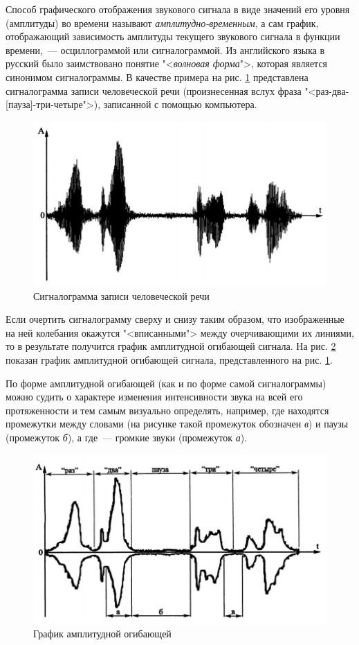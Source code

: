 \documentclass[oneside, final, 14pt]{extreport}
\begin{document}
Способ графического отображения звукового сигнала в виде значений его уровня (амплитуды) во времени называют {\itshape амплитудно-временным}, а сам график, отображающий зависимость амплитуды текущего звукового сигнала в функции времени,~--- осциллограммой или сигналограммой. Из английского языка в русский было заимствовано понятие "<{\itshape волновая форма}">, которая является синонимом сигналограммы. В качестве примера на рис. \ref{pic-waveform-01} представлена сигналограмма записи человеческой речи (произнесенная вслух фраза "<раз-два-[пауза]-три-четыре">), записанной с помощью компьютера.

\begin{figure}[h]
\centering
\includegraphics{pic-waveform-01}
\caption{Сигналограмма записи человеческой речи}
\label{pic-waveform-01}
\end{figure}

Если очертить сигналограмму сверху и снизу таким образом, что изображенные на ней колебания окажутся "<вписанными"> между очерчивающими их линиями, то в результате получится график амплитудной огибающей сигнала. На рис. \ref{pic-waveform-02} показан график амплитудной огибающей сигнала, представленного на рис. \ref{pic-waveform-01}.

По форме амплитудной огибающей (как и по форме самой сигналограммы) можно судить о характере изменения интенсивности звука на всей его протяженности и тем самым визуально определять, например, где находятся промежутки между словами (на рисунке такой промежуток обозначен {\itshape в}) и паузы (промежуток {\itshape б}), а где~--- громкие звуки (промежуток {\itshape а}).

\begin{figure}[h]
\centering
\includegraphics{pic-waveform-02}
\caption{График амплитудной огибающей}
\label{pic-waveform-02}
\end{figure}
\end{document}
